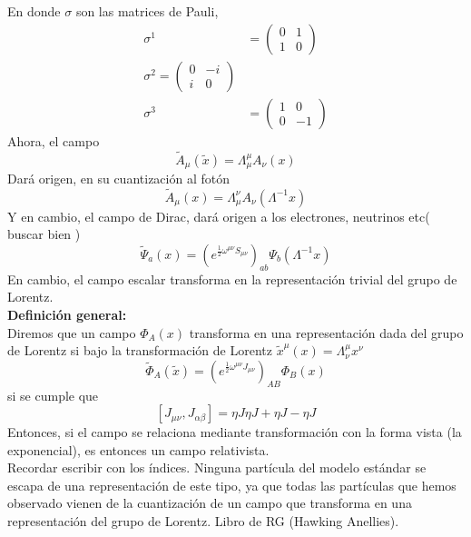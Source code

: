 \documentclass[../main.tex]{subfiles}
\begin{document}
  En donde $\sigma$ son las matrices de Pauli,
  \begin{align*}
    \sigma^1 & = \begin{pmatrix}
      0 & 1 \\ 1 & 0
    \end{pmatrix}
    \\
    \sigma^2 = \begin{pmatrix}
      0 & -i \\ i & 0
    \end{pmatrix}
    \\
    \sigma^3 & = \begin{pmatrix}
      1 & 0 \\ 0 & -1
    \end{pmatrix}
  \end{align*}
  Ahora, el campo
  \begin{equation*}
    \tilde{{A}}_\mu(\tilde{x}) = \Lambda^\mu_\mu A_\nu(x)
  \end{equation*}
  Dará origen, en su cuantización al fotón
  \begin{equation*}
    \tilde{{A}}_\mu (x) = \Lambda_\mu^\nu A_\nu(\Lambda^{-1}x)
  \end{equation*}
  Y en cambio, el campo de Dirac, dará origen a los electrones, neutrinos etc( buscar bien )
  \begin{equation*}
    \tilde{\Psi}_a(x) = \left( e^{\frac{1}{2}\omega^{\mu \nu}S_{\mu \nu}} \right)_{ab} \Psi_b (\Lambda^{-1}x)
  \end{equation*}
  En cambio, el campo escalar transforma en la representación trivial del grupo de Lorentz. \\
  \textbf{Definición general:} \\
  Diremos que un campo $\Phi_A(x)$ transforma en una representación dada del grupo de Lorentz si bajo la transformación de Lorentz $\tilde{x}^\mu(x) = \Lambda^{\mu}_\nu x^\nu $ 
  \begin{equation}
    \tilde{\Phi}_A(\tilde{x}) = \left( e^{\frac{1}{2}\omega^{\mu \nu}J_{\mu \nu}} \right)_{AB}\Phi_B(x)
   \end{equation}
   si se cumple que
   \begin{equation}
     \left[ J_{\mu \nu}, J_{\alpha \beta} \right] = \eta J   \eta J + \eta J - \eta J 
    \end{equation}
    Entonces, si el campo se relaciona mediante transformación con la forma vista (la exponencial), es entonces un campo relativista. \\
    Recordar escribir con los índices. Ninguna partícula del modelo estándar se escapa de una representación de este tipo, ya que todas las partículas que hemos observado vienen de la cuantización de un campo que transforma en una representación del grupo de Lorentz. Libro de RG (Hawking Anellies). \\
\end{document}
